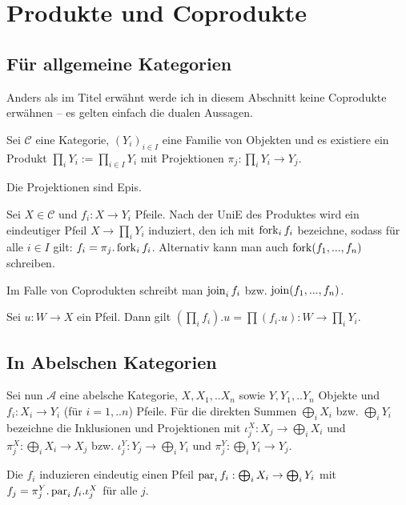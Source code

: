 \section{Produkte und Coprodukte}

\subsection{Für allgemeine Kategorien}

Anders als im Titel erwähnt werde ich in diesem Abschnitt keine Coprodukte erwähnen -- es gelten einfach die dualen Aussagen.

Sei $\mathcal C$ eine Kategorie, $(Y_i)_{i\in I}$ eine Familie von Objekten und es existiere ein Produkt $\prod_i Y_i := \prod_{i\in I} Y_i$ mit Projektionen $\pi_j : \prod_i Y_i \to Y_j$.

\begin{prop} Die Projektionen sind Epis.
\end{prop}

Sei $X\in \mathcal C$ und $f_i : X \to Y_i$ Pfeile. Nach der UniE des Produktes wird ein eindeutiger Pfeil $X \to \prod_i Y_i$ induziert, den ich mit $\operatorname{fork}_i f_i$ bezeichne, sodass für alle $i\in I$ gilt: $f_i = \pi_j . \operatorname{fork}_i f_i$. Alternativ kann man auch $\operatorname{fork}(f_1,...,f_n)$ schreiben.

Im Falle von Coprodukten schreibt man $\operatorname{join}_i f_i$ bzw. $\operatorname{join}(f_1,...,f_n)$.

\begin{prop} Sei $u : W \to X$ ein Pfeil. Dann gilt $(\prod_i f_i) . u = \prod (f_i . u): W \to \prod_i Y_i$.
\end{prop}


\subsection{In Abelschen Kategorien}

Sei nun $\mathcal A$ eine abelsche Kategorie, $X,X_1,..X_n$ sowie $Y,Y_1,..Y_n$ Objekte und $f_i : X_i \to Y_i$ (für $i = 1,..n$) Pfeile.
Für die direkten Summen $\bigoplus_i X_i$ bzw. $\bigoplus_i Y_i$ bezeichne die Inklusionen und Projektionen mit $\iota^X_j : X_j \to \bigoplus_i X_i$ und $\pi^X_j : \bigoplus_i X_i \to X_j$ bzw. $\iota^Y_j : Y_j \to \bigoplus_i Y_i$ und $\pi^Y_j : \bigoplus_i Y_i \to Y_j$.

\begin{prop} Die $f_i$ induzieren eindeutig einen Pfeil $\operatorname{par}_i f_i : \bigoplus_i X_i \to \bigoplus_i Y_i$ mit $f_j = \pi^Y_j . \operatorname{par}_i f_i . \iota^X_j$ für alle $j$.
\end{prop}

